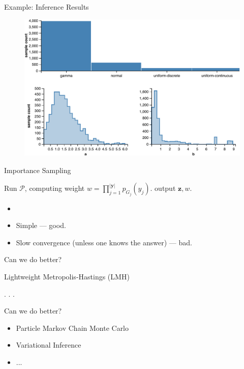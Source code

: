 \documentclass{beamer}
\begin{document}
\begin{frame}{Example: Inference Results}
  \begin{figure}[H]
      \includegraphics[scale=0.6]{models-results.pdf}
  \end{figure}
\end{frame}

\begin{frame}{Importance Sampling}
    \begin{algorithmic}
        \Loop
            \State Run $\mathcal{P}$, computing weight $w=\prod_{j=1}^{\left|\pmb{y}\right|}p_{G_j}(y_{j})$.
            \State output $\pmb{z}, w$.
        \EndLoop
    \end{algorithmic}
    \begin{itemize}
        \item[] 
         \item Simple --- good.
         \item Slow convergence (unless one knows the answer) --- bad.
     \end{itemize}
     \vfill
     Can we do better?
\end{frame}

\begin{frame}{Lightweight Metropolis-Hastings (LMH)}
\begin{algorithmic}
    \Loop
         .
         .
         .
    \EndLoop
\end{algorithmic}
\vfill
Can we do better?
\begin{itemize}
    \item Particle Markov Chain Monte Carlo
    \item Variational Inference
    \item ...

\end{itemize}
\end{frame}
\end{document}
